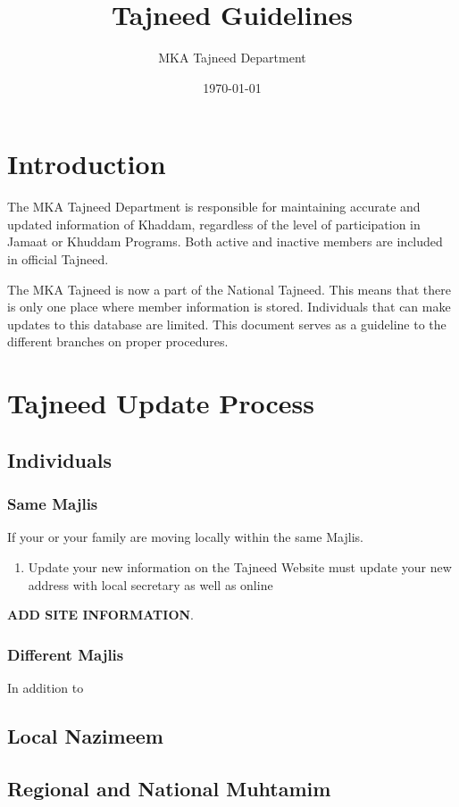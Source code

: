 \documentclass[11pt]{article}
\author{MKA Tajneed Department}
\date{\today}
\title{Tajneed Guidelines}
\begin{document}
\maketitle
\tableofcontents



\section{Introduction}
\label{sec:orgf2ec0b8}
The MKA Tajneed Department is responsible for maintaining accurate
and updated information of Khaddam, regardless of the level of
participation in Jamaat or Khuddam Programs. Both active and
inactive members are included in official Tajneed.

The MKA Tajneed is now a part of the National Tajneed. This means that
there is only one place where member information is
stored. Individuals that can make updates to this database are
limited. This document serves as a guideline to the different branches
on proper procedures.

\section{Tajneed Update Process}
\label{sec:org66a3172}
\subsection{Individuals}
\label{sec:org7ce4bea}
\subsubsection{Same Majlis}
\label{sec:org8a5d1d5}
If your or your family are moving locally within the same Majlis.
\begin{enumerate}
\item Update your new information on the Tajneed Website must update your
new address with local secretary as well as online
\end{enumerate}
\textbf{ADD SITE INFORMATION}.
\subsubsection{Different Majlis}
\label{sec:org964fc43}
In addition to
\subsection{Local Nazimeem}
\label{sec:orge6e3c1a}

\subsection{Regional and National Muhtamim}
\label{sec:org48c0dd2}
\end{document}
